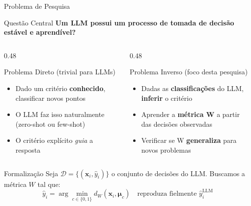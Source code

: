 \documentclass[aspectratio=169, 8pt]{beamer}
\begin{document}
\begin{frame}{Problema de Pesquisa}
  \begin{block}{Questão Central}
    \centering
    \Large
    \textbf{Um LLM possui um processo de tomada de decisão}\\
    \textbf{estável e aprendível?}
  \end{block}

  \vspace{0.2em}

  \begin{columns}[T]
    \begin{column}{0.48\textwidth}
      \begin{block}{Problema Direto (trivial para LLMs)}
        \begin{itemize}
          \item Dado um critério \textbf{conhecido}, classificar novos pontos
          \item O LLM faz isso naturalmente (zero-shot ou few-shot)
          \item O critério explícito \emph{guia} a resposta
        \end{itemize}
      \end{block}
    \end{column}

    \begin{column}{0.48\textwidth}
      \begin{alertblock}{Problema Inverso (foco desta pesquisa)}
        \begin{itemize}
          \item Dadas as \textbf{classificações} do LLM, \textbf{inferir} o critério
          \item Aprender a \textbf{métrica W} a partir das decisões observadas
          \item Verificar se W \textbf{generaliza} para novos problemas
        \end{itemize}
      \end{alertblock}
    \end{column}
  \end{columns}

  \vspace{0.2em}

  \begin{exampleblock}{Formalização}
    \centering
    Seja $\mathcal{D} = \{(\mathbf{x}_i, \hat{y}_i)\}$ o conjunto de decisões do LLM.
    Buscamos a métrica $W$ tal que:
    \[
      \hat{y}_i = \arg\min_{c \in \{0,1\}} d_W(\mathbf{x}_i, \boldsymbol{\mu}_c)
      \quad \text{reproduza fielmente } \hat{y}_i^{\text{LLM}}
    \]
  \end{exampleblock}
\end{frame}
\end{document}
